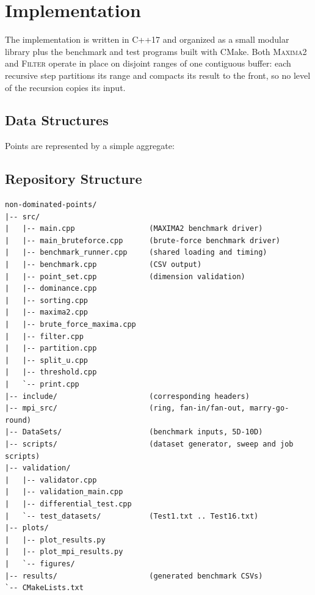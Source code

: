 \documentclass[11pt]{article}
\begin{document}
\section{Implementation}

The implementation is written in C++17 and organized as a small modular
library plus the benchmark and test programs built with CMake. Both
\textsc{Maxima2} and \textsc{Filter} operate in place on disjoint ranges
of one contiguous buffer: each recursive step partitions its range and
compacts its result to the front, so no level of the recursion copies its
input.

\subsection{Data Structures}

Points are represented by a simple aggregate:


\subsection{Repository Structure}

\begin{verbatim}
non-dominated-points/
|-- src/
|   |-- main.cpp                 (MAXIMA2 benchmark driver)
|   |-- main_bruteforce.cpp      (brute-force benchmark driver)
|   |-- benchmark_runner.cpp     (shared loading and timing)
|   |-- benchmark.cpp            (CSV output)
|   |-- point_set.cpp            (dimension validation)
|   |-- dominance.cpp
|   |-- sorting.cpp
|   |-- maxima2.cpp
|   |-- brute_force_maxima.cpp
|   |-- filter.cpp
|   |-- partition.cpp
|   |-- split_u.cpp
|   |-- threshold.cpp
|   `-- print.cpp
|-- include/                     (corresponding headers)
|-- mpi_src/                     (ring, fan-in/fan-out, marry-go-round)
|-- DataSets/                    (benchmark inputs, 5D-10D)
|-- scripts/                     (dataset generator, sweep and job scripts)
|-- validation/
|   |-- validator.cpp
|   |-- validation_main.cpp
|   |-- differential_test.cpp
|   `-- test_datasets/           (Test1.txt .. Test16.txt)
|-- plots/
|   |-- plot_results.py
|   |-- plot_mpi_results.py
|   `-- figures/
|-- results/                     (generated benchmark CSVs)
`-- CMakeLists.txt
\end{verbatim}
\end{document}
